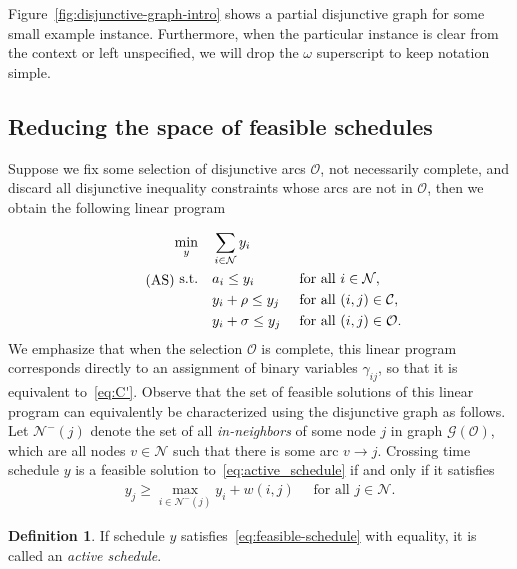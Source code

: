 \documentclass{report}
\theoremstyle{definition}
\newtheorem{define}{Definition}[chapter]
\theoremstyle{plain}
\begin{document}
Figure~\ref{fig:disjunctive-graph-intro} shows a partial disjunctive graph for
some small example instance. Furthermore, when the particular instance is clear
from the context or left unspecified, we will drop the $\omega$ superscript to keep
notation simple.


\subsection{Reducing the space of feasible schedules}

Suppose we fix some selection of disjunctive arcs $\mathcal{O}$, not
necessarily complete, and discard all disjunctive inequality constraints whose
arcs are not in $\mathcal{O}$, then we obtain the following linear program

\begin{equation}\label{eq:active_schedule}\tag{AS}
\begin{alignedat}{3}
  \min_{y} \quad & \sum_{i \in \mathcal{N}} y_{i} \\
  \text{s.t.} \quad & a_{i} \leq y_{i} && \quad \text{ for all } i \in \mathcal{N}, \notag \\
                 & y_{i} + \rho \leq y_{j} && \quad \text{ for all } (i,j) \in \mathcal{C}, \notag \\
                 & y_{i} + \sigma \leq y_{j} && \quad \text{ for all } (i,j) \in \mathcal{O} . \notag
\end{alignedat}
\end{equation}
We emphasize that when the selection $\mathcal{O}$ is complete, this linear
program corresponds directly to an assignment of binary variables $\gamma_{ij}$, so
that it is equivalent to~\eqref{eq:C'}.
%
Observe that the set of feasible solutions of this linear program can
equivalently be characterized using the disjunctive graph as follows.
%
Let $\mathcal{N}^{-}(j)$ denote the set of all \emph{in-neighbors} of some node
$j$ in graph $\mathcal{G}(\mathcal{O})$, which are all nodes $v \in \mathcal{N}$ such that
there is some arc $v \rightarrow j$.
%
Crossing time schedule $y$ is a feasible solution to~\eqref{eq:active_schedule} if and only if it
satisfies
\begin{align}\label{eq:feasible-schedule}
    y_j \geq \max_{i \in \mathcal{N}^{-}(j)} y_i + w(i,j)
    \quad \text{ for all } j \in \mathcal{N} .
\end{align}

\begin{define}\label{def:active}
  If schedule $y$ satisfies~\eqref{eq:feasible-schedule} with equality, it is called an
  \emph{active schedule}.
\end{define}
%
\end{document}

